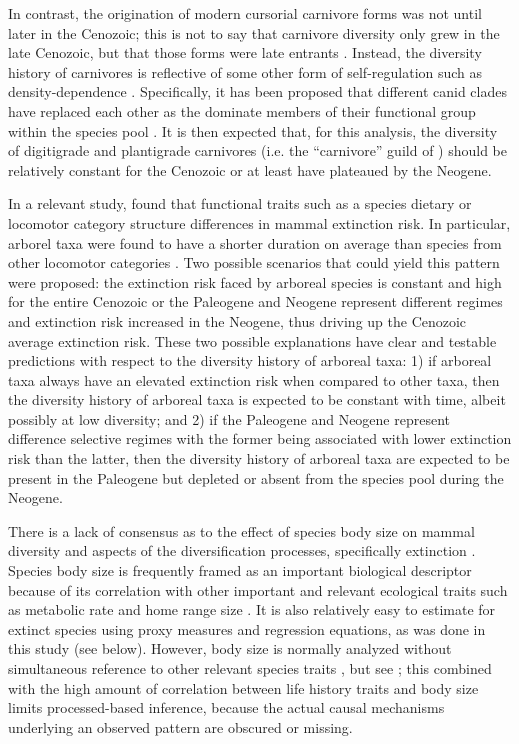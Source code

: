 \documentclass[12pt,letterpaper]{article}
\begin{document}
In contrast, the origination of modern cursorial carnivore forms was not until later in the Cenozoic; this is not to say that carnivore diversity only grew in the late Cenozoic, but that those forms were late entrants \citep{Janis1993c}. Instead, the diversity history of carnivores is reflective of some other form of self-regulation such as density-dependence \citep{Valkenburgh1999,Silvestro2015b,Slater2015c}. Specifically, it has been proposed that different canid clades have replaced each other as the dominate members of their functional group within the species pool \citep{Silvestro2015b,Valkenburgh1999}. It is then expected that, for this analysis, the diversity of digitigrade and plantigrade carnivores (i.e. the ``carnivore'' guild of \citet{Valkenburgh1999}) should be relatively constant for the Cenozoic or at least have plateaued by the Neogene.

In a relevant study, \citet{Smits2015b} found that functional traits such as a species dietary or locomotor category structure differences in mammal extinction risk. In particular, arborel taxa were found to have a shorter duration on average than species from other locomotor categories \citep{Smits2015b}. Two possible scenarios that could yield this pattern were proposed: the extinction risk faced by arboreal species is constant and high for the entire Cenozoic or the Paleogene and Neogene represent different regimes and extinction risk increased in the Neogene, thus driving up the Cenozoic average extinction risk. These two possible explanations have clear and testable predictions with respect to the diversity history of arboreal taxa: 1) if arboreal taxa always have an elevated extinction risk when compared to other taxa, then the diversity history of arboreal taxa is expected to be constant with time, albeit possibly at low diversity; and 2) if the Paleogene and Neogene represent difference selective regimes with the former being associated with lower extinction risk than the latter, then the diversity history of arboreal taxa are expected to be present in the Paleogene but depleted or absent from the species pool during the Neogene.

There is a lack of consensus as to the effect of species body size on mammal diversity and aspects of the diversification processes, specifically extinction \citep{Liow2008,Liow2009,Tomiya2013,Smits2015b}. Species body size is frequently framed as an important biological descriptor because of its correlation with other important and relevant ecological traits such as metabolic rate and home range size \citep{Brown1995}. It is also relatively easy to estimate for extinct species using proxy measures and regression equations, as was done in this study (see below). However, body size is normally analyzed without simultaneous reference to other relevant species traits \citep{Liow2008,Huang2017,Raia2012f,Smith2004}, but see \citep{Smits2015b}; this combined with the high amount of correlation between life history traits and body size limits processed-based inference, because the actual causal mechanisms underlying an observed pattern are obscured or missing.
\end{document}
